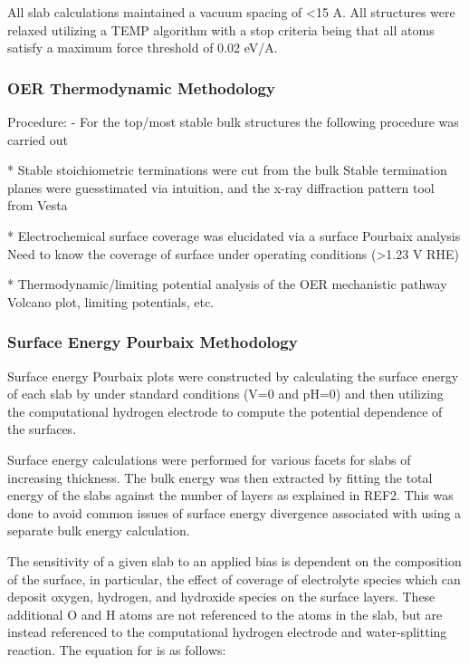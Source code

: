 
All slab calculations maintained a vacuum spacing of <15 A.
All structures were relaxed utilizing a TEMP algorithm with a stop criteria being that all atoms satisfy a maximum force threshold of 0.02 eV/A.

\subsubsection{OER Thermodynamic Methodology}
Procedure:
- For the top/most stable bulk structures the following procedure was carried out

* Stable stoichiometric terminations were cut from the bulk Stable termination planes were guesstimated via intuition, and the x-ray diffraction pattern tool from Vesta

* Electrochemical surface coverage was elucidated via a surface Pourbaix analysis Need to know the coverage of surface under operating conditions (>1.23 V RHE)

* Thermodynamic/limiting potential analysis of the OER mechanistic pathway Volcano plot, limiting potentials, etc.

\subsubsection{Surface Energy Pourbaix Methodology}
Surface energy Pourbaix plots were constructed by calculating the surface energy of each slab by under standard conditions (V=0 and pH=0) and then utilizing the computational hydrogen electrode to compute the potential dependence of the surfaces.

Surface energy calculations were performed for various facets for slabs of increasing thickness.
The bulk energy was then extracted by fitting the total energy of the slabs against the number of layers as explained in REF2.
This was  done to avoid common issues of surface energy divergence associated with using a separate bulk energy calculation.

The sensitivity of a given slab to an applied bias is dependent on the composition of the surface,
in particular, the effect of coverage of electrolyte species which can deposit oxygen, hydrogen, and hydroxide species on the surface layers.
These additional O and H atoms are not referenced to the atoms in the slab, but are instead referenced to the computational hydrogen electrode and water-splitting reaction.
The equation for is as follows:






